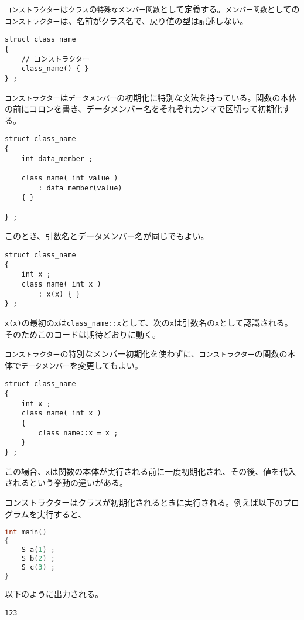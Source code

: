 \texttt{コンストラクター}は\texttt{クラス}の\texttt{特殊なメンバー関数}として定義する。\texttt{メンバー関数}としての\texttt{コンストラクター}は、名前がクラス名で、戻り値の型は記述しない。

\begin{lstlisting}[style=grammar]
struct class_name
{
    // コンストラクター
    class_name() { }
} ;
\end{lstlisting}

\texttt{コンストラクター}は\texttt{データメンバー}の初期化に特別な文法を持っている。関数の本体の前にコロンを書き、データメンバー名をそれぞれカンマで区切って初期化する。

\begin{lstlisting}[style=grammar]
struct class_name
{
    int data_member ;

    class_name( int value )
        : data_member(value)
    { }
    
} ;
\end{lstlisting}

このとき、引数名とデータメンバー名が同じでもよい。

\begin{lstlisting}[style=grammar]
struct class_name
{
    int x ;
    class_name( int x )
        : x(x) { }
} ;
\end{lstlisting}

\texttt{x(x)}の最初の\texttt{x}は\texttt{class\_name::x}として、次の\texttt{x}は引数名の\texttt{x}として認識される。そのためこのコードは期待どおりに動く。

\texttt{コンストラクター}の特別なメンバー初期化を使わずに、\texttt{コンストラクター}の関数の本体で\texttt{データメンバー}を変更してもよい。

\begin{lstlisting}[style=grammar]
struct class_name
{
    int x ;
    class_name( int x )
    {
        class_name::x = x ;
    }
} ;
\end{lstlisting}

この場合、\texttt{x}は関数の本体が実行される前に一度初期化され、その後、値を代入されるという挙動の違いがある。

コンストラクターはクラスが初期化されるときに実行される。例えば以下のプログラムを実行すると、
\begin{lstlisting}[language={C++}]
int main()
{
    S a(1) ;
    S b(2) ;
    S c(3) ;
}
\end{lstlisting}
以下のように出力される。
\begin{lstlisting}[style=terminal]
123
\end{lstlisting}

